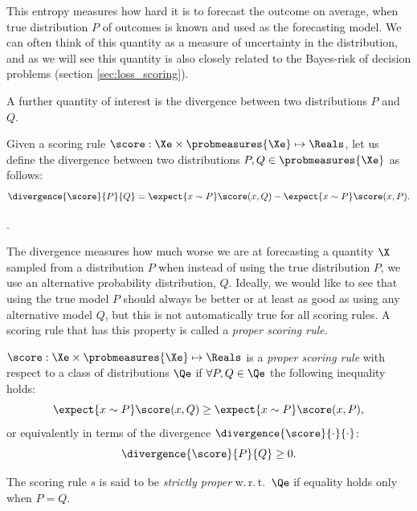 This entropy measures how hard it is to forecast the outcome on average, when true distribution $P$ of outcomes is known and used as the forecasting model. We can often think of this quantity as a measure of uncertainty in the distribution, and as we will see this quantity is also closely related to the Bayes-risk of decision problems (section \ref{sec:loss_scoring}).

A further quantity of interest is the divergence between two distributions $P$ and $Q$.

\begin{definition}
Given a scoring rule $\score:\Xe\times\probmeasures{\Xe}\mapsto\Reals$, let us define the divergence between two distributions $P,Q\in\probmeasures{\Xe}$ as follows:
	\begin{equation}
		\divergence{\score}{P}{Q} = \expect{x\sim P} \score(x,Q) - \expect{x\sim P} \score(x,P)\mbox{.}\label{eqn:def_divergence}
	\end{equation}
\end{definition}

.

The divergence measures how much worse we are at forecasting a quantity $\X$ sampled from a distribution $P$ when instead of using the true distribution $P$, we use an alternative probability distribution, $Q$. Ideally, we would like to see that using the true model $P$ should always be better or at least as good as using any alternative model $Q$, but this is not automatically true for all scoring rules. A scoring rule that has this property is called a \emph{proper scoring rule}.

\begin{definition}
	$\score:\Xe\times\probmeasures{\Xe}\mapsto\Reals$ is a \emph{proper scoring rule} with respect to a class of distributions $\Qe$ if $\forall P,Q\in\Qe$ the following inequality holds:
	\begin{equation}
		\expect{x\sim P} \score(x,Q) \geq \expect{x\sim P} \score(x,P),
	\end{equation}
	or equivalently in terms of the divergence $\divergence{\score}{\cdot}{\cdot}$:
	\begin{equation}
		\divergence{\score}{P}{Q} \geq 0.
	\end{equation}
	
	The scoring rule $s$ is said to be \emph{strictly proper} w.\,r.\,t.\ $\Qe$ if equality holds only when $P=Q$.
\end{definition}

